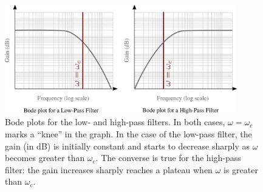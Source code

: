 \begin{figure}[!htb]
    \centering
    \includegraphics[width=0.9\textwidth]{figs/electronics-circuits/RC-gain.png}
    \caption{Bode plots for the low- and high-pass filters. In both cases, $\omega = \omega_c$ marks a ``knee'' in the graph. In the case of the low-pass filter, the gain (in dB) is initially constant and starts to decrease sharply as $\omega$ becomes greater than $\omega_c$. The converse is true for the high-pass filter: the gain increases sharply reaches a plateau when $\omega$ is greater than $\omega_c$.}
    \label{fig:RC-bode}
\end{figure}

